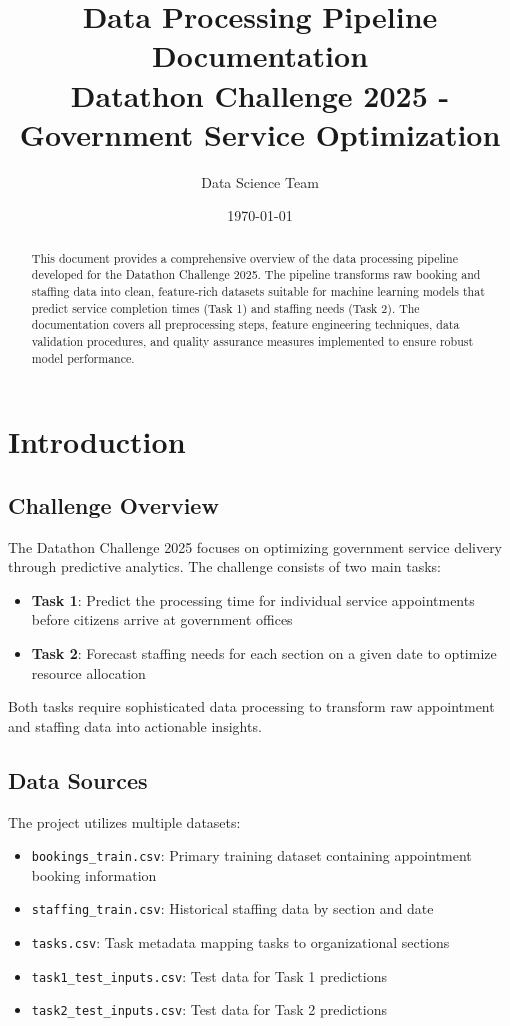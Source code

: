 \documentclass[12pt,a4paper]{article}
\title{Data Processing Pipeline Documentation \\
       Datathon Challenge 2025 - Government Service Optimization}
\author{Data Science Team}
\date{\today}
\begin{document}
\maketitle

\begin{abstract}
This document provides a comprehensive overview of the data processing pipeline developed for the Datathon Challenge 2025. The pipeline transforms raw booking and staffing data into clean, feature-rich datasets suitable for machine learning models that predict service completion times (Task 1) and staffing needs (Task 2). The documentation covers all preprocessing steps, feature engineering techniques, data validation procedures, and quality assurance measures implemented to ensure robust model performance.
\end{abstract}

\tableofcontents
\newpage

\section{Introduction}

\subsection{Challenge Overview}

The Datathon Challenge 2025 focuses on optimizing government service delivery through predictive analytics. The challenge consists of two main tasks:

\begin{itemize}
    \item \textbf{Task 1}: Predict the processing time for individual service appointments before citizens arrive at government offices
    \item \textbf{Task 2}: Forecast staffing needs for each section on a given date to optimize resource allocation
\end{itemize}

Both tasks require sophisticated data processing to transform raw appointment and staffing data into actionable insights.

\subsection{Data Sources}

The project utilizes multiple datasets:

\begin{itemize}
    \item \texttt{bookings\_train.csv}: Primary training dataset containing appointment booking information
    \item \texttt{staffing\_train.csv}: Historical staffing data by section and date
    \item \texttt{tasks.csv}: Task metadata mapping tasks to organizational sections
    \item \texttt{task1\_test\_inputs.csv}: Test data for Task 1 predictions
    \item \texttt{task2\_test\_inputs.csv}: Test data for Task 2 predictions
\end{itemize}
\end{document}
